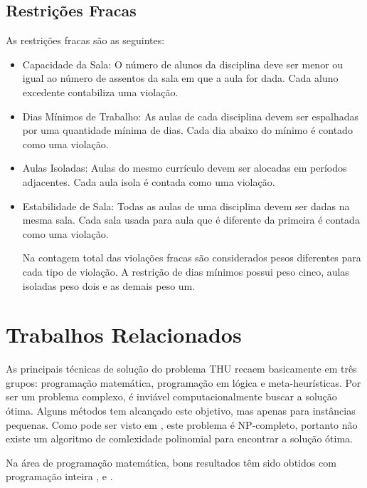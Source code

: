 \documentclass[11pt]{article}
\begin{document}
\subsection{Restrições Fracas}

As restrições fracas são as seguintes:

\begin{itemize}

\item Capacidade da Sala: O número de alunos da disciplina deve ser menor ou igual ao número de assentos da sala em que a aula for dada. Cada aluno excedente contabiliza uma violação.

\item Dias Mínimos de Trabalho: As aulas de cada disciplina devem ser espalhadas por uma quantidade mínima de dias. Cada dia abaixo do mínimo é contado como uma violação.

\item Aulas Isoladas: Aulas do mesmo currículo devem ser alocadas em períodos adjacentes. Cada aula isola é contada como uma violação.

\item Estabilidade de Sala: Todas as aulas de uma disciplina devem ser dadas na mesma sala. Cada sala usada para aula que é diferente da primeira é contada como uma violação.

Na contagem total das violações fracas são considerados pesos diferentes para cada tipo de violação. A restrição de dias mínimos possui peso cinco, aulas isoladas peso dois e as demais peso um.

\end{itemize}


\section{Trabalhos Relacionados}

As principais técnicas de solução do problema THU recaem basicamente em três grupos: programação matemática, programação em lógica e meta-heurísticas. Por ser um problema complexo, é inviável computacionalmente buscar a solução ótima. Alguns métodos tem alcançado este objetivo, mas apenas para instâncias pequenas. Como pode ser visto em \cite{Schaerf95asurvey}, este problema é NP-completo, portanto não existe um algoritmo de comlexidade polinomial para encontrar a solução ótima.

Na área de programação matemática, bons resultados têm sido obtidos com programação inteira \cite{lach_lubbecke}, \cite{broek_hurkens} e \cite{Burke_abranch-andcut}.
\end{document}
